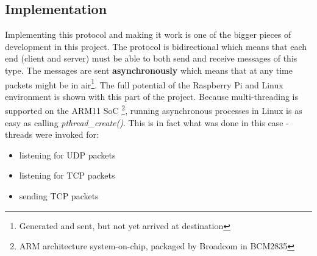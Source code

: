 \documentclass{IEEEtran}
\begin{document}
\subsection*{Implementation}
Implementing this protocol and making it work is one of the bigger pieces of development in this project. The protocol is bidirectional which means that each end (client and server) must be able to both send and receive messages of this type. The messages are sent \textbf{asynchronously} which means that at any time packets might be in air\footnote{Generated and sent, but not yet arrived at destination}. The full potential of the Raspberry Pi and Linux environment is shown with this part of the project. 
\newline
\newline
Because multi-threading is supported on the ARM11 SoC \footnote{ARM architecture system-on-chip, packaged by Broadcom in BCM2835}, running asynchronous processes in Linux is as easy as calling \textit{pthread\_create()}. This is in fact what was done in this case - threads were invoked for:
\begin{itemize}
    \item listening for UDP packets
    \item listening for TCP packets
    \item sending TCP packets
\end{itemize}
\end{document}

